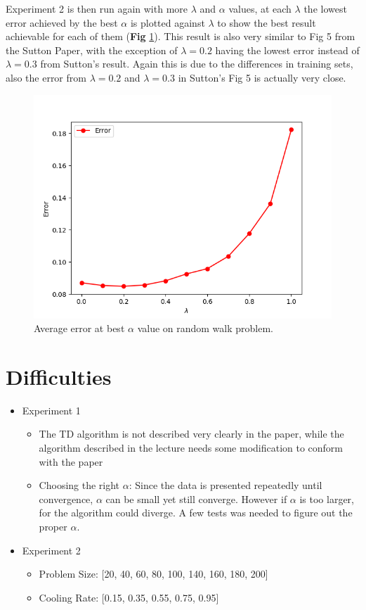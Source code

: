 \documentclass[10pt]{article}
\begin{document}
Experiment 2 is then run again with more $\lambda$ and $\alpha$ values, at each $\lambda$ the lowest error achieved by the best $\alpha$ is plotted against $\lambda$ to show the best result achievable for each of them (\textbf{Fig} \ref{fig:fig5}). This result is also very similar to Fig 5 from the Sutton Paper, with the exception of $\lambda=0.2$ having the lowest error instead of $\lambda=0.3$ from Sutton's result. Again this is due to the differences in training sets, also the error from $\lambda=0.2$ and $\lambda=0.3$ in Sutton's Fig 5 is actually very close.



\begin{figure}[H]
  \centering
  \includegraphics[width=0.6\linewidth]{../results/experiment3_2.png}
     \caption{Average error at best $\alpha$ value on random walk problem.}
  \label{fig:fig5}
\end{figure}





\section{Difficulties} \label{difficulties}

   	\begin{itemize}
     		\item  Experiment 1
     			\begin{itemize}
					\item  The TD algorithm is not described very clearly in the paper, while the algorithm described in the lecture needs some modification to conform with the paper
       				\item  Choosing the right $\alpha$: Since the data is presented repeatedly until convergence, $\alpha$ can be small yet still converge. However if $\alpha$ is too larger, for the algorithm could diverge. A few tests was needed to figure out the proper $\alpha$.
    			 \end{itemize}
		     \item  Experiment 2
    			 \begin{itemize}
    				   \item  Problem Size: [20, 40, 60, 80, 100, 140, 160, 180, 200]
       				   \item Cooling Rate: [0.15, 0.35, 0.55, 0.75, 0.95]
     			 \end{itemize}
	\end{itemize}
\end{document}
